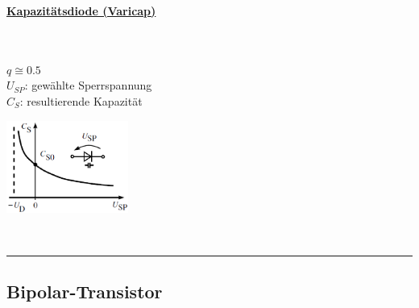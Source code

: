             \begin{minipage}[t]{9cm}
                \underline{\bf Kapazit\"atsdiode (Varicap)}\\
                \begin{minipage}[t]{4.9cm}
                    \\\\
                    $q \cong 0.5$\\
                    $U_{SP}$: gew\"ahlte Sperrspannung\\
                    $C_S$: resultierende Kapazit\"at
                \end{minipage}
                \begin{minipage}{4cm}
                    \includegraphics[width=4cm]{./bilder/CDiodeEig}
                \end{minipage}
            \end{minipage}\\
\hrule
        \subsection{Bipolar-Transistor}
